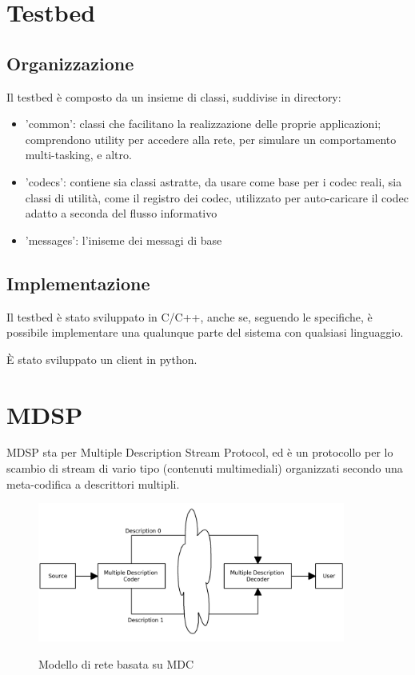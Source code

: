 \section{Testbed}



\subsection{Organizzazione}


Il testbed è composto da un insieme di classi, suddivise in directory:



\begin{itemize}
\item 'common': classi che facilitano la realizzazione delle proprie applicazioni; comprendono utility per accedere alla rete, per simulare un comportamento multi-tasking, e altro.

\item 'codecs': contiene sia classi astratte, da usare come base per i codec
reali, sia classi di utilità, come il registro dei codec, utilizzato per auto-caricare il codec adatto a seconda del flusso informativo

\item 'messages': l'iniseme dei messagi di base
\end{itemize}




\subsection{Implementazione}


Il testbed è stato sviluppato in C/C++, anche se, seguendo le specifiche, è
possibile implementare una qualunque parte del sistema con qualsiasi linguaggio.

\`E stato sviluppato un client in python.



\section{MDSP}


MDSP sta per Multiple Description Stream Protocol, ed è un protocollo per lo
scambio di stream di vario tipo (contenuti multimediali) organizzati secondo una
meta-codifica a descrittori multipli.

\begin{figure}[b]
\includegraphics[width=0.90\textwidth]{../images/network_mdc.png}
\label{fig:network_mdc}
\caption{Modello di rete basata su MDC}
\end{figure}

